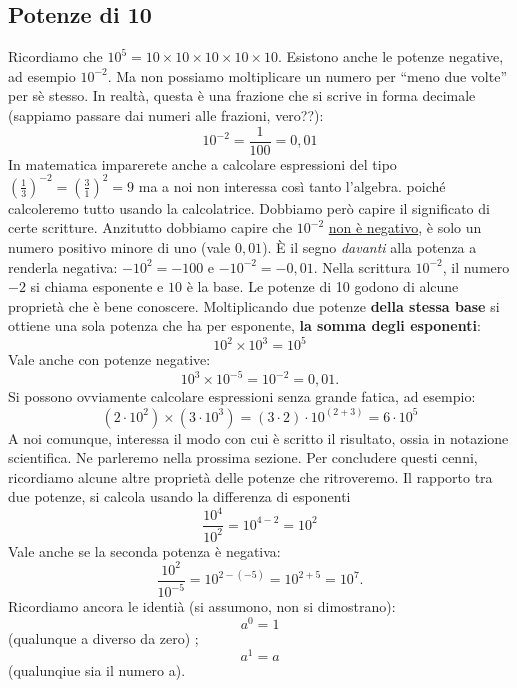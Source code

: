 \subsection{Potenze di 10}
Ricordiamo che $10^5=10\times 10 \times 10\times 10\times10$. Esistono anche le potenze negative, ad esempio $10^{-2}$. Ma non possiamo moltiplicare un numero per ``meno due volte'' per sè stesso. In realtà, questa è una frazione che si scrive in forma decimale (sappiamo passare dai numeri alle frazioni, vero??):
\[
10^{-2}=\frac{1}{100} = 0,01
\]
In matematica imparerete anche a calcolare espressioni del tipo $\left(\frac{1}{3}\right)^{-2} =\left(\frac{3}{1}\right)^{2} = 9$ ma a noi non interessa così tanto l'algebra. poiché calcoleremo tutto usando la calcolatrice. Dobbiamo però capire il significato di certe scritture. Anzitutto dobbiamo capire che $10^{-2}$ \underline{non è negativo}, è solo un numero positivo minore di uno (vale $0,01$). È il segno \emph{davanti} alla potenza a renderla negativa: $-10^{2}=-100$ e $-10^{-2}=-0,01$. Nella scrittura $10^{-2}$, il numero $-2$ si chiama esponente e $10$ è la base. Le potenze di 10 godono di alcune proprietà che è bene conoscere. Moltiplicando due potenze \textbf{della stessa base} si ottiene una sola potenza che ha per esponente, \textbf{la somma degli esponenti}:
\[
10^2\times 10^3 = 10^5
\]
Vale anche con potenze negative:
\[
10^3\times10^{-5} = 10^{-2} = 0,01.
\]
Si possono ovviamente calcolare espressioni senza grande fatica, ad esempio:
\[
\left( 2 \cdot 10^2 \right) \times \left( 3 \cdot 10^3 \right) = \left( 3 \cdot 2 \right) \cdot 10^{(2+3)} = 6 \cdot 10^5
\]
A noi comunque, interessa il modo con cui è scritto il risultato, ossia  in notazione scientifica. Ne parleremo nella prossima sezione. Per concludere questi cenni, ricordiamo alcune altre proprietà delle potenze che ritroveremo. Il rapporto tra due potenze, si calcola usando la differenza di esponenti
\[
\frac{10^4}{10^2}=10^{4-2} = 10^2
\]
Vale anche se la seconda potenza è negativa:
\[
\frac{10^2}{10^{-5}}=10^{2-(-5)} = 10^{2+5} = 10^7.
\]
Ricordiamo ancora le identià (si assumono, non si dimostrano): $$a^0 =1 $$ (qualunque a diverso da zero)  ; $$a^1 = a$$ (qualunqiue sia il numero a).  
